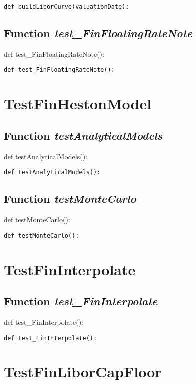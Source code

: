 \documentclass[twoside,11pt]{book}
\begin{document}
\begin{lstlisting}
def buildLiborCurve(valuationDate):
\end{lstlisting}

\subsection{Function {\it test\_FinFloatingRateNote}}
def test\_FinFloatingRateNote():

\begin{lstlisting}
def test_FinFloatingRateNote():
\end{lstlisting}


\newpage
\section{TestFinHestonModel}

\subsection{Function {\it testAnalyticalModels}}
def testAnalyticalModels():

\begin{lstlisting}
def testAnalyticalModels():
\end{lstlisting}

\subsection{Function {\it testMonteCarlo}}
def testMonteCarlo():

\begin{lstlisting}
def testMonteCarlo():
\end{lstlisting}


\newpage
\section{TestFinInterpolate}

\subsection{Function {\it test\_FinInterpolate}}
def test\_FinInterpolate():

\begin{lstlisting}
def test_FinInterpolate():
\end{lstlisting}


\newpage
\section{TestFinLiborCapFloor}
\end{document}
